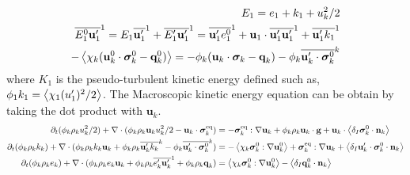 \begin{align*}
    E_1 = e_1 + k_1 + u_k^2/2\\
    \overline{E_1^0\textbf{u}_1'}^1
    = 
    E_1\overline{\textbf{u}_1'}^1
    + \overline{E_1'\textbf{u}_1'}^1
    = 
    \overline{\textbf{u}_1' e_1^0}^1
    + \textbf{u}_1 \cdot \overline{\textbf{u}_1'  \textbf{u}_1'}^1
    +\overline{\textbf{u}_1' k_1 }^1\\
    - \left<\chi_k(\textbf{u}_k^0 \cdot \bm{\sigma}_k^0 - \textbf{q}_k^0)\right>
    =- \phi_k (\textbf{u}_k \cdot \bm{\sigma}_k - \textbf{q}_k) 
    - \phi_k \overline{\textbf{u}_k' \cdot \bm{\sigma}_k^0}^k
\end{align*}
where $K_1$ is the pseudo-turbulent kinetic energy defined such as, $\phi_1 k_1 = \left<\chi_1 (u_1')^2/2\right>$. 
The Macroscopic kinetic energy equation can be obtain by taking the dot product with $\textbf{u}_k$. 
\begin{align}
    \partial_t (\phi_k \rho_ku_k^2/2)  
    + \mathbf{\nabla}\cdot (
        \phi_k \rho_k\textbf{u}_ku_k^2/2
        - \textbf{u}_k \cdot \bm{\sigma}_k^\text{eq}
    )
    &= 
    - \bm{\sigma}_k^\text{eq} : \mathbf{\nabla} \textbf{u}_k
    + \phi_k \rho_k \textbf{u}_k\cdot \textbf{g} 
    +  \textbf{u}_k\cdot \left<\delta_I \bm{\sigma}_k^0 \cdot \textbf{n}_k\right>\\
    \partial_t (\phi_k\rho_kk_k)  
    + \mathbf{\nabla}\cdot (
        \phi_k\rho_kk_k\textbf{u}_k
        + \phi_k\rho_k \overline{\textbf{u}_k' k_k}^k 
        - \phi_k\overline{\textbf{u}_k' \cdot \bm{\sigma}_k^0}^k
        )
    &= 
    - \left<\chi_k\bm{\sigma}_k^0 : \mathbf{\nabla} \textbf{u}_k^0\right>
    + \bm{\sigma}_k^\text{eq} : \mathbf{\nabla} \textbf{u}_k
    + \left<\delta_I \textbf{u}_k' \cdot \bm{\sigma}_k^0 \cdot \textbf{n}_k\right>\\
    \partial_t (\phi_k\rho_ke_k)  
    + \mathbf{\nabla}\cdot (
        \phi_k \rho_ke_k\textbf{u}_k
        +
        \phi_k \rho_k\overline{e_k'\textbf{u}_k'}^1
        + \phi_k\rho_k\textbf{q}_k
        )
    &= 
    \left<\chi_k\bm{\sigma}_k^0 : \mathbf{\nabla} \textbf{u}_k^0\right>
    - \left<\delta_I \textbf{q}_k^0 \cdot \textbf{n}_k\right> 
\end{align}


